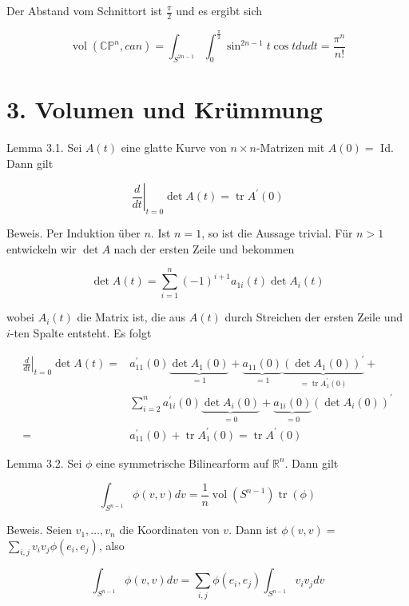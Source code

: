 \documentclass[10pt, letterpaper]{article}
\begin{document}
Der Abstand vom Schnittort ist $\frac{\pi}{2}$ und es ergibt sich

$$
\operatorname{vol}\left(\mathbb{C P}^{n}, c a n\right)=\int_{S^{2 n-1}} \int_{0}^{\frac{\pi}{2}} \sin ^{2 n-1} t \cos t d u d t=\frac{\pi^{n}}{n!}
$$

\section*{3. Volumen und Krümmung}
Lemma 3.1. Sei $A(t)$ eine glatte Kurve von $n \times n$-Matrizen mit $A(0)=$ Id. Dann gilt

$$
\left.\frac{d}{d t}\right|_{t=0} \operatorname{det} A(t)=\operatorname{tr} A^{\prime}(0)
$$

Beweis. Per Induktion über $n$. Ist $n=1$, so ist die Aussage trivial. Für $n>1$ entwickeln wir $\operatorname{det} A$ nach der ersten Zeile und bekommen

$$
\operatorname{det} A(t)=\sum_{i=1}^{n}(-1)^{i+1} a_{1 i}(t) \operatorname{det} A_{i}(t)
$$

wobei $A_{i}(t)$ die Matrix ist, die aus $A(t)$ durch Streichen der ersten Zeile und $i$-ten Spalte entsteht. Es folgt

$$
\begin{aligned}
\left.\frac{d}{d t}\right|_{t=0} \operatorname{det} A(t)= & a_{11}^{\prime}(0) \underbrace{\operatorname{det} A_{1}(0)}_{=1}+\underbrace{a_{11}(0)}_{=1} \underbrace{\left(\operatorname{det} A_{1}(0)\right)^{\prime}}_{=\operatorname{tr} A_{1}^{\prime}(0)}+ \\
& \sum_{i=2}^{n} a_{1 i}^{\prime}(0) \underbrace{\operatorname{det} A_{i}(0)}_{=0}+\underbrace{a_{1 i}(0)}_{=0}\left(\operatorname{det} A_{i}(0)\right)^{\prime} \\
= & a_{11}^{\prime}(0)+\operatorname{tr} A_{1}^{\prime}(0)=\operatorname{tr} A^{\prime}(0)
\end{aligned}
$$

Lemma 3.2. Sei $\phi$ eine symmetrische Bilinearform auf $\mathbb{R}^{n}$. Dann gilt

$$
\int_{S^{n-1}} \phi(v, v) d v=\frac{1}{n} \operatorname{vol}\left(S^{n-1}\right) \operatorname{tr}(\phi)
$$

Beweis. Seien $v_{1}, \ldots, v_{n}$ die Koordinaten von $v$. Dann ist $\phi(v, v)=$ $\sum_{i, j} v_{i} v_{j} \phi\left(e_{i}, e_{j}\right)$, also

$$
\int_{S^{n-1}} \phi(v, v) d v=\sum_{i, j} \phi\left(e_{i}, e_{j}\right) \int_{S^{n-1}} v_{i} v_{j} d v
$$
\end{document}
